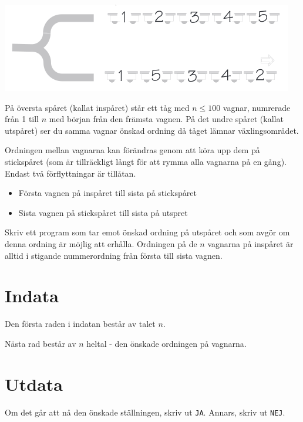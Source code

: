 
\includegraphics{tag.png}

På översta spåret (kallat inspåret) står ett tåg med $n \le 100$ vagnar, numrerade från 1 till $n$ med början från den främsta vagnen. På det undre spåret (kallat utspåret) ser du samma vagnar  önskad ordning då tåget lämnar växlingsområdet.

Ordningen mellan vagnarna kan förändras genom att köra upp dem på stickspåret (som är tillräckligt långt för att rymma alla vagnarna på en gång). Endast två förflyttningar är tillåtan.

\begin{itemize}
\item Första vagnen på inspåret till sista på stickspåret
\item Sista vagnen på stickspåret till sista på utspret
\end{itemize}
Skriv ett program som tar emot önskad ordning på utspåret och som avgör om denna ordning är möjlig att erhålla. Ordningen på de $n$ vagnarna på inspåret är alltid i stigande nummerordning från första till sista vagnen.

\section*{Indata}
Den första raden i indatan består av talet $n$.

Nästa rad består av $n$ heltal - den önskade ordningen på vagnarna.

\section*{Utdata}
Om det går att nå den önskade ställningen, skriv ut \texttt{JA}. Annars, skriv ut \texttt{NEJ}.
